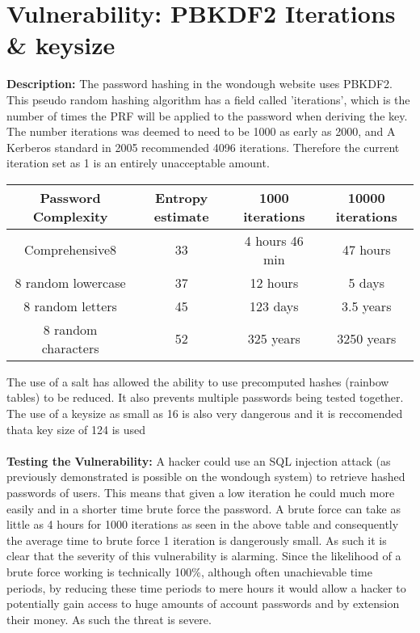 \section{Vulnerability: PBKDF2 Iterations \& keysize}
\label{sec:background}
\textbf{Description:} The password hashing in the wondough website uses PBKDF2. This pseudo random hashing algorithm has a field called 'iterations', which is the number of times
the PRF will be applied to the password when deriving the key. The number iterations was deemed to need to be 1000 as early as 2000, and A Kerberos standard in 2005 recommended
4096 iterations. Therefore the current iteration set as 1 is an entirely unacceptable amount\cite{Cyrptosense2015}.\begin{center}
   \begin{tabular}{ |c|c|c|c| }
    \hline
    Password Complexity & Entropy estimate & 1000 iterations &  10000 iterations\\
    \hline
    Comprehensive8 & 33 & 4 hours 46 min & 47 hours \\
    8 random lowercase & 37 & 12 hours & 5 days \\
    8 random letters & 45 & 123 days & 3.5 years \\
    8 random characters & 52 & 325 years & 3250 years \\
    \hline
   \end{tabular}
   \end{center}
The use of a salt has allowed the ability to use precomputed hashes (rainbow tables) to be reduced. It also prevents multiple passwords being tested together. The use of a keysize
as small as 16 is also very dangerous and it is reccomended thata key size of 124 is used \cite{keysize}\\ \\
\textbf{Testing the Vulnerability:} A hacker could use an SQL injection attack (as previously demonstrated is possible on the wondough system) to retrieve hashed passwords of
users. This means that given a low iteration he could much more easily and in a shorter time brute force the password. A brute force can take as little as 4 hours for 1000
iterations as seen in the above table and consequently the average time to brute force 1 iteration is dangerously small. As such it is clear that the severity of this vulnerability
is alarming. Since the likelihood of a brute force working is technically 100\%, although often unachievable time periods, by reducing these time periods to mere hours it
would allow a hacker to potentially gain access to huge amounts of account passwords and by extension their money. As such the threat is severe. \\ \\
